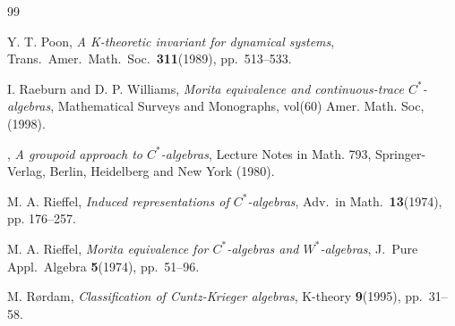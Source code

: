 \documentclass[11pt]{article}
\theoremstyle{plain}
\theoremstyle{definition}
\numberwithin{equation}{section}
\begin{document}
\begin{thebibliography}{99}


{\sc Y. T. Poon},
{\it A K-theoretic invariant for dynamical systems}, 
Trans.\  Amer.\ Math.\ Soc.\ 
{\bf 311}(1989), pp.\ 513--533.









{\sc I. Raeburn and D. P. Williams},
{\it Morita equivalence and continuous-trace $C^*$-algebras},
Mathematical Surveys and Monographs, vol(60)
Amer. Math. Soc, (1998).



,
{\it A groupoid approach to $C^*$-algebras},
Lecture Notes in Math.  793, 
Springer-Verlag, Berlin, Heidelberg and New York (1980).


{\sc M. A. Rieffel},
{\it Induced representations of $C^*$-algebras},
Adv.\ in Math.\
{\bf 13}(1974), pp. 176--257.


{\sc M. A. Rieffel},
{\it  Morita equivalence for  $C^*$-algebras and  $W^*$-algebras},
J.\ Pure Appl.\ Algebra {\bf 5}(1974), pp.\ 51--96.  











{\sc M. R{\o}rdam},
{\it Classification of Cuntz-Krieger algebras},
 K-theory {\bf 9}(1995), pp.\  31--58.






\end{thebibliography}
\end{document}
